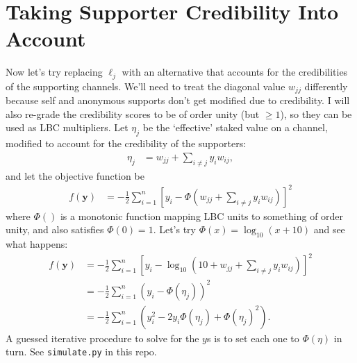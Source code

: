 \documentclass[a4paper, 12pt]{article}
\begin{document}
\section{Taking Supporter Credibility Into Account}
Now let's try replacing $\ell_j$ with an alternative that accounts for the
credibilities of the supporting channels. We'll need to treat the diagonal
value $w_{jj}$ differently because self and anonymous supports don't get
modified due to credibility. I will also re-grade the credibility scores
to be of order unity (but $\geq 1$), so they can be used as LBC multipliers.
Let $\eta_j$ be the `effective' staked value on a channel, modified to account
for the credibility of the supporters:
\begin{align}
\eta_j &= w_{jj} + \sum_{i \neq j} y_i w_{ij},
\end{align}
and let the objective function be
\begin{align}
f(\boldsymbol{y}) &= -\frac{1}{2}\sum_{i=1}^n \left[
                            y_i - \Phi\left(w_{jj} + \sum_{i \neq j} y_i w_{ij}\right)
                        \right]^2
\end{align}
where $\Phi()$ is a monotonic function mapping LBC units to something of order
unity, and also satisfies $\Phi(0) = 1$. Let's try
$\Phi(x) = \log_{10}(x + 10)$ and see what happens:
\begin{align}
f(\boldsymbol{y}) &= -\frac{1}{2}\sum_{i=1}^n \left[
                            y_i - \log_{10}\left(10 + w_{jj} + \sum_{i \neq j} y_i w_{ij}\right)
                        \right]^2 \\
    &= -\frac{1}{2}\sum_{i=1}^n\left(y_i - \Phi(\eta_j)\right)^2 \\
    &= -\frac{1}{2}\sum_{i=1}^n\left(y_i^2 - 2y_i\Phi(\eta_j) + \Phi(\eta_j)^2\right).
\end{align}
A guessed iterative procedure to solve for the $y$s is to set each one to
$\Phi(\eta)$ in turn. See {\tt simulate.py} in this repo.




\end{document}
